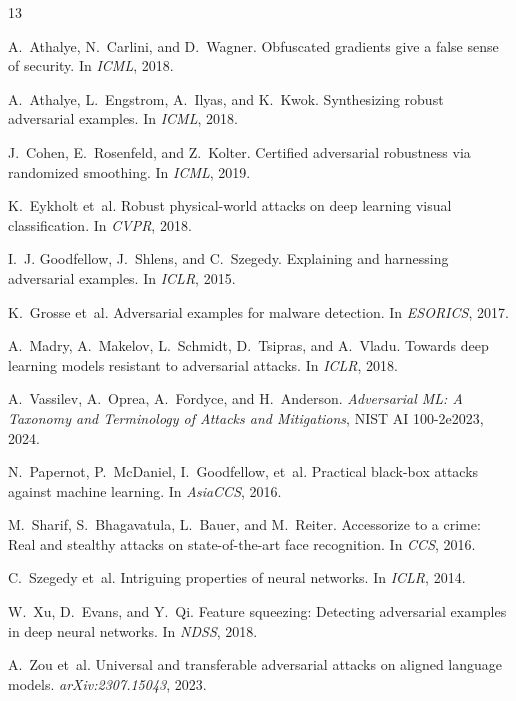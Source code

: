 \documentclass[10pt, twocolumn]{article}
\begin{document}
{\scriptsize
\setlength{\bibsep}{0pt plus 0.3ex}

\begin{thebibliography}{13}

A.~Athalye, N.~Carlini, and D.~Wagner.
\newblock Obfuscated gradients give a false sense of security.
\newblock In \emph{ICML}, 2018.

A.~Athalye, L.~Engstrom, A.~Ilyas, and K.~Kwok.
\newblock Synthesizing robust adversarial examples.
\newblock In \emph{ICML}, 2018.

J.~Cohen, E.~Rosenfeld, and Z.~Kolter.
\newblock Certified adversarial robustness via randomized smoothing.
\newblock In \emph{ICML}, 2019.

K.~Eykholt et~al.
\newblock Robust physical-world attacks on deep learning visual classification.
\newblock In \emph{CVPR}, 2018.

I.~J. Goodfellow, J.~Shlens, and C.~Szegedy.
\newblock Explaining and harnessing adversarial examples.
\newblock In \emph{ICLR}, 2015.

K.~Grosse et~al.
\newblock Adversarial examples for malware detection.
\newblock In \emph{ESORICS}, 2017.

A.~Madry, A.~Makelov, L.~Schmidt, D.~Tsipras, and A.~Vladu.
\newblock Towards deep learning models resistant to adversarial attacks.
\newblock In \emph{ICLR}, 2018.

A.~Vassilev, A.~Oprea, A.~Fordyce, and H.~Anderson.
\newblock \emph{Adversarial ML: A Taxonomy and Terminology of Attacks and Mitigations}, NIST AI 100-2e2023, 2024.

N.~Papernot, P.~McDaniel, I.~Goodfellow, et~al.
\newblock Practical black-box attacks against machine learning.
\newblock In \emph{AsiaCCS}, 2016.

M.~Sharif, S.~Bhagavatula, L.~Bauer, and M.~Reiter.
\newblock Accessorize to a crime: Real and stealthy attacks on state-of-the-art face recognition.
\newblock In \emph{CCS}, 2016.

C.~Szegedy et~al.
\newblock Intriguing properties of neural networks.
\newblock In \emph{ICLR}, 2014.

W.~Xu, D.~Evans, and Y.~Qi.
\newblock Feature squeezing: Detecting adversarial examples in deep neural networks.
\newblock In \emph{NDSS}, 2018.

A.~Zou et~al.
\newblock Universal and transferable adversarial attacks on aligned language models.
\newblock \emph{arXiv:2307.15043}, 2023.

\end{thebibliography}
}
\end{document}
